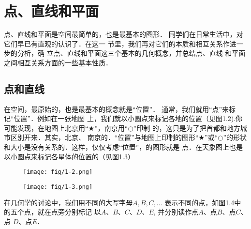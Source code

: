 \section{点、直线和平面}
点、直线和平面是空间最简单的，也是最基本的图形．
同学们在日常生活中，对它们早已有直观的认识了．在这一
节里，我们再对它们的本质和相互关系作进一步的分析，确
立点、直线和平面这三个基本的几何概念，并总结点、直线
和平面之间相互关系方面的一些基本性质．

\subsection{点和直线}
在空间，最原始的，也是最基本的概念就是“位置”．
通常，我们就用“点”来标记“位置”．例如在一张地图
上，我们就以小圆点来标记各地的位置（见图1.2).你
可能发现，在地图上北京用“$\bigstar$”，南京用“$\bigcirc$”印制
的，这只是为了把首都和地方城市区别开来．其实，北京、
南京的．“位置”与地图上印制的图形“$\bigstar$”或“$\bigcirc$”的形状
和大小是没有关系的．这样，仅仅考虑“位置”，的图形就是
点．在天象图上也是以小圆点来标记各星体的位置的（见图1.3）

\begin{figure}[htp]\centering
    \begin{minipage}[t]{0.48\textwidth}
    \centering
\texttt{[image: fig/1-2.png]}
    \caption{}
    \end{minipage}
    \begin{minipage}[t]{0.48\textwidth}
    \centering
	\texttt{[image: fig/1-3.png]}
    \caption{}
    \end{minipage}
    \end{figure}



在几何学的讨论中，我们用不同的大写字母$A,B,C,\ldots$
表示不同的点，如图1.4中的五个点，就在点旁分别标记
以$A$、$B$、$C$、$D$、$E$, 并分别读作点$A$、点$B$、点$C$、点
$D$、点$E$．

